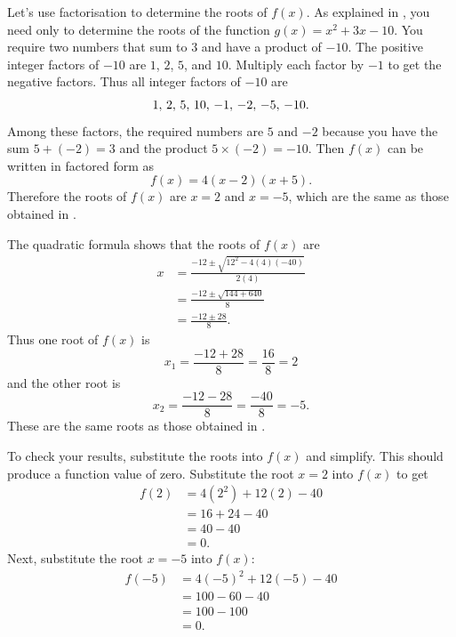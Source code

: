 \documentclass[a4paper,oneside,12pt]{article}
\begin{document}
{\begin{solution}
Let's use factorisation to determine the roots of $f(x)$.  As
explained
in , you
need only to determine the roots of the function
$g(x) = x^2 + 3x - 10$.  You require two numbers that sum to $3$ and
have a product of $-10$.  The positive integer factors of $-10$ are
$1$, $2$, $5$, and $10$.  Multiply each factor by $-1$ to get the
negative factors.  Thus all integer factors of $-10$ are
\[
{1},\, {2},\, {5},\, {10},\, {-1},\, {-2},\, {-5},\, {-10}.
\]
Among these factors, the required numbers are $5$ and $-2$ because you
have the sum $5 + (-2) = 3$ and the product $5 \times (-2) = -10$.
Then $f(x)$ can be written in factored form as
\[
f(x)
=
4(x - 2) (x + 5).
\]
Therefore the roots of $f(x)$ are $x = 2$ and $x = -5$, which are the
same as those obtained
in .

The quadratic formula shows that the roots of $f(x)$ are
\begin{align*}
x
&=
\frac{
  -12
  \pm
  \sqrt{
    12^2 - 4(4)(-40)
  }
}{
  2(4)
} \\[4pt]
&=
\frac{
  -12
  \pm
  \sqrt{144 + 640}
}{
  8
} \\[4pt]
&=
\frac{
  -12 \pm 28
}{
  8
}.
\end{align*}
Thus one root of $f(x)$ is
\[
x_1
=
\frac{-12 + 28}{8}
=
\frac{16}{8}
=
2
\]
and the other root is
\[
x_2
=
\frac{-12 - 28}{8}
=
\frac{-40}{8}
=
-5.
\]
These are the same roots as those obtained
in .

To check your results, substitute the roots into $f(x)$ and simplify.
This should produce a function value of zero.  Substitute the root
$x = 2$ into $f(x)$ to get
\begin{align*}
f(2)
&=
4(2^2) + 12(2) - 40 \\[4pt]
&=
16 + 24 - 40 \\[4pt]
&=
40 - 40 \\[4pt]
&=
0.
\end{align*}
Next, substitute the root $x = -5$ into $f(x)$:
\begin{align*}
f(-5)
&=
4(-5)^2 + 12(-5) - 40 \\[4pt]
&=
100 - 60 - 40 \\[4pt]
&=
100 - 100 \\[4pt]
&=
0.
\end{align*}
\end{solution}
}{}
\end{document}
